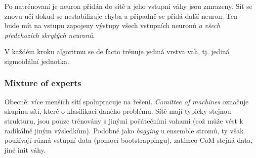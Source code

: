 \documentclass[11pt]{report} %
\numberwithin{equation}{section}
\begin{document}
Po natrénovaní je neuron přidán do sítě a jeho vstupní váhy jsou zmrazeny. Síť se znovu učí dokud se nestabilizuje chyba a případně se přidá další neuron. Ten bude mít na vstupu zapojeny výstupy všech vstupních neuronů \textit{a všech předchozích skrytých neuronů}.

V každém kroku algoritmu se de facto trénuje jediná vrstva vah, tj. jediná sigmoidální jednotka.

\subsubsection{Mixture of experts}
Obecně: více menších sítí spolupracuje na řešení. \textit{Comittee of machines} označuje skupinu sítí, které  o klasifikaci daného problému. Sítě mají typicky stejnou strukturu, jsou pouze trénovány s jinými počátečními vahami (což může vést k radikálně jiným výsledkům). Podobné jako \textit{bagging} u ensemble stromů, ty však používají různá vstupní data (pomocí bootstrappingu), zatímco CoM stejná data, jiné init váhy.
\end{document}

